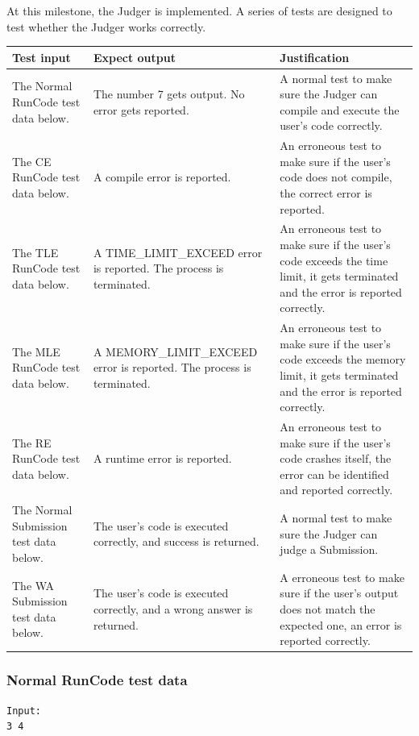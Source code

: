 \documentclass[a4paper]{report}
\begin{document}
At this milestone, the Judger is implemented. A series of tests are designed to test whether the Judger works correctly.

\begin{tabulary}{\textwidth}{|L|L|L|}
    \hline
    Test input & Expect output & Justification \\
    \hline
    The Normal RunCode test data below. & The number 7 gets output. No error gets reported. & A normal test to make sure the Judger can compile and execute the user's code correctly. \\
    \hline
    The CE RunCode test data below. & A compile error is reported. & An erroneous test to make sure if the user's code does not compile, the correct error is reported. \\
    \hline
    The TLE RunCode test data below. & A TIME_LIMIT_EXCEED error is reported. The process is terminated. & An erroneous test to make sure if the user's code exceeds the time limit, it gets terminated and the error is reported correctly. \\
    \hline
    The MLE RunCode test data below. & A MEMORY_LIMIT_EXCEED error is reported. The process is terminated. & An erroneous test to make sure if the user's code exceeds the memory limit, it gets terminated and the error is reported correctly. \\
    \hline
    The RE RunCode test data below. & A runtime error is reported. & An erroneous test to make sure if the user's code crashes itself, the error can be identified and reported correctly. \\
    \hline
    The Normal Submission test data below. & The user's code is executed correctly, and success is returned. & A normal test to make sure the Judger can judge a Submission. \\
    \hline
    The WA Submission test data below. & The user's code is executed correctly, and a wrong answer is returned. & A erroneous test to make sure if the user's output does not match the expected one, an error is reported correctly. \\
    \hline
\end{tabulary}

\subsubsection{Normal RunCode test data}

\begin{verbatim}
Input:
3 4    
\end{verbatim}
\end{document}
